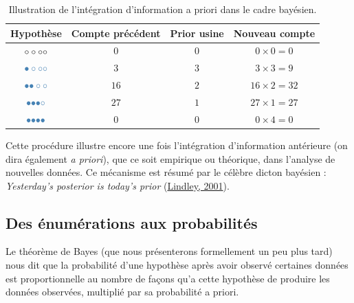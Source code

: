 \documentclass[
  a4paper,11pt,twoside,onecolumn,openright,final,oldfontcommands]{memoir}
\theoremstyle{definition}
\theoremstyle{definition}
\theoremstyle{definition}
\theoremstyle{definition}
\theoremstyle{remark}
\begin{document}
\begin{table}[!htb]

\begin{center}
\begin{threeparttable}

\caption{\label{tab:prior-table}Illustration de l'intégration d'information a priori dans le cadre bayésien.}

\begin{tabular}{cccc}
\toprule
Hypothèse & Compte précédent & Prior usine & Nouveau compte\\
\midrule
$\LARGE \circ \circ \circ \circ$ & $0$ & $0$ & $0 \times 0 = 0$\\
$\LARGE \color{steelblue}{\bullet} \circ \circ \circ$ & $3$ & $3$ & $3 \times 3 = 9$\\
$\LARGE \color{steelblue}{\bullet} \color{steelblue}{\bullet} \circ \circ$ & $16$ & $2$ & $16 \times 2 = 32$\\
$\LARGE \color{steelblue}{\bullet} \color{steelblue}{\bullet} \color{steelblue}{\bullet} \circ$ & $27$ & $1$ & $27 \times 1 = 27$\\
$\LARGE \color{steelblue}{\bullet} \color{steelblue}{\bullet} \color{steelblue}{\bullet} \color{steelblue}{\bullet}$ & $0$ & $0$ & $0 \times 4 = 0$\\
\bottomrule
\end{tabular}

\end{threeparttable}
\end{center}

\end{table}

Cette procédure illustre encore une fois l'intégration d'information antérieure (on dira également \emph{a priori}), que ce soit empirique ou théorique, dans l'analyse de nouvelles données. Ce mécanisme est résumé par le célèbre dicton bayésien : \emph{Yesterday's posterior is today's prior} (\protect\hyperlink{ref-lindley_philosophy_2001}{Lindley, 2001}).

\hypertarget{des-uxe9numuxe9rations-aux-probabilituxe9s}{%
\subsection{Des énumérations aux probabilités}\label{des-uxe9numuxe9rations-aux-probabilituxe9s}}

Le théorème de Bayes (que nous présenterons formellement un peu plus tard) nous dit que la probabilité d'une hypothèse après avoir observé certaines données est proportionnelle au nombre de façons qu'a cette hypothèse de produire les données observées, multiplié par sa probabilité a priori.
\end{document}
